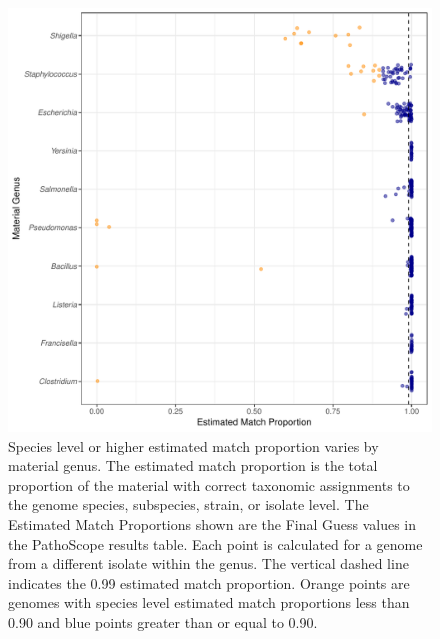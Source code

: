 \documentclass[fleqn,10pt,lineno]{wlpeerj}\usepackage[]{graphicx}\usepackage[]{color}
\makeatletter
\def\maxwidth{ %
  \ifdim\Gin@nat@width>\linewidth
    \linewidth
  \else
    \Gin@nat@width
  \fi
}
\newenvironment{knitrout}{}{} %
\makeatother
\begin{document}
\begin{knitrout}
\color{fgcolor}\begin{figure}
\includegraphics[width=\maxwidth]{figure/species_prop-1} \caption[Species level or higher estimated match proportion varies by material genus]{Species level or higher estimated match proportion varies by material genus. The estimated match proportion is the total proportion of the material with correct taxonomic assignments to the genome species, subspecies, strain, or isolate level. The Estimated Match Proportions shown are the Final Guess values in the PathoScope results table. Each point is calculated for a genome from a different isolate within the genus. The vertical dashed line indicates the 0.99 estimated match proportion. Orange points are genomes with species level estimated match proportions less than 0.90 and blue points greater than or equal to 0.90.}\label{fig:species_prop}
\end{figure}


\end{knitrout}
\end{document}
